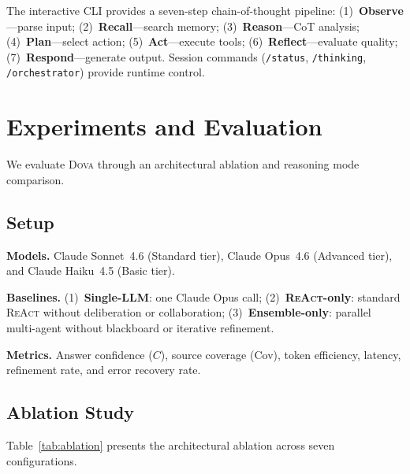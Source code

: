 \documentclass{article}
\theoremstyle{plain}
\theoremstyle{definition}
\newcommand{\dova}{\textsc{Dova}}
\newcommand{\react}{\textsc{ReAct}}
\begin{document}
The interactive CLI provides a seven-step chain-of-thought pipeline:
(1)~\textbf{Observe}---parse input;
(2)~\textbf{Recall}---search memory;
(3)~\textbf{Reason}---CoT analysis;
(4)~\textbf{Plan}---select action;
(5)~\textbf{Act}---execute tools;
(6)~\textbf{Reflect}---evaluate quality;
(7)~\textbf{Respond}---generate output.
Session commands (\texttt{/status}, \texttt{/thinking}, \texttt{/orchestrator})
provide runtime control.

\section{Experiments and Evaluation}\label{sec:experiments}

We evaluate \dova{} through an architectural ablation and reasoning mode
comparison.

\subsection{Setup}

\textbf{Models.}\quad
Claude Sonnet~4.6 (Standard tier), Claude Opus~4.6 (Advanced tier),
and Claude Haiku~4.5 (Basic tier).

\textbf{Baselines.}\quad
(1)~\textbf{Single-LLM}: one Claude Opus call;
(2)~\textbf{\react{}-only}: standard \react{} without deliberation or
collaboration;
(3)~\textbf{Ensemble-only}: parallel multi-agent without blackboard or
iterative refinement.

\textbf{Metrics.}\quad
Answer confidence ($C$), source coverage (Cov), token efficiency, latency,
refinement rate, and error recovery rate.

\subsection{Ablation Study}\label{sec:ablation}

Table~\ref{tab:ablation} presents the architectural ablation across seven
configurations.
\end{document}
